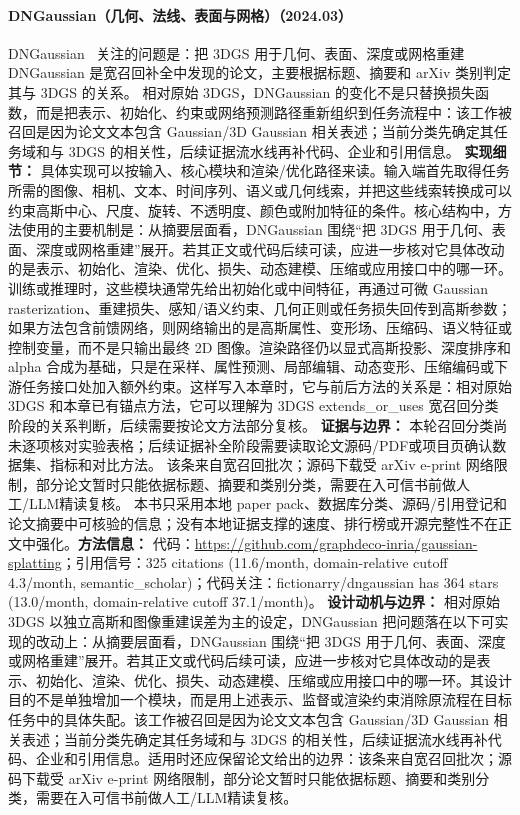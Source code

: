 \paragraph{DNGaussian（几何、法线、表面与网格）（2024.03）}
DNGaussian~\cite{2403_06912} 关注的问题是：把 3DGS 用于几何、表面、深度或网格重建 DNGaussian 是宽召回补全中发现的论文，主要根据标题、摘要和 arXiv 类别判定其与 3DGS 的关系。
相对原始 3DGS，DNGaussian 的变化不是只替换损失函数，而是把表示、初始化、约束或网络预测路径重新组织到任务流程中：该工作被召回是因为论文文本包含 Gaussian/3D Gaussian 相关表述；当前分类先确定其任务域和与 3DGS 的相关性，后续证据流水线再补代码、企业和引用信息。
\textbf{实现细节：} 具体实现可以按输入、核心模块和渲染/优化路径来读。输入端首先取得任务所需的图像、相机、文本、时间序列、语义或几何线索，并把这些线索转换成可以约束高斯中心、尺度、旋转、不透明度、颜色或附加特征的条件。核心结构中，方法使用的主要机制是：从摘要层面看，DNGaussian 围绕“把 3DGS 用于几何、表面、深度或网格重建”展开。若其正文或代码后续可读，应进一步核对它具体改动的是表示、初始化、渲染、优化、损失、动态建模、压缩或应用接口中的哪一环。 训练或推理时，这些模块通常先给出初始化或中间特征，再通过可微 Gaussian rasterization、重建损失、感知/语义约束、几何正则或任务损失回传到高斯参数；如果方法包含前馈网络，则网络输出的是高斯属性、变形场、压缩码、语义特征或控制变量，而不是只输出最终 2D 图像。渲染路径仍以显式高斯投影、深度排序和 alpha 合成为基础，只是在采样、属性预测、局部编辑、动态变形、压缩编码或下游任务接口处加入额外约束。这样写入本章时，它与前后方法的关系是：相对原始 3DGS 和本章已有锚点方法，它可以理解为 3DGS extends\_or\_uses 宽召回分类阶段的关系判断，后续需要按论文方法部分复核。
\textbf{证据与边界：} 本轮召回分类尚未逐项核对实验表格；后续证据补全阶段需要读取论文源码/PDF或项目页确认数据集、指标和对比方法。 该条来自宽召回批次；源码下载受 arXiv e-print 网络限制，部分论文暂时只能依据标题、摘要和类别分类，需要在入可信书前做人工/LLM精读复核。 本书只采用本地 paper pack、数据库分类、源码/引用登记和论文摘要中可核验的信息；没有本地证据支撑的速度、排行榜或开源完整性不在正文中强化。\textbf{方法信息：} 代码：\url{https://github.com/graphdeco-inria/gaussian-splatting}；引用信号：325 citations (11.6/month, domain-relative cutoff 4.3/month, semantic\_scholar)；代码关注：fictionarry/dngaussian has 364 stars (13.0/month, domain-relative cutoff 37.1/month)。
\textbf{设计动机与边界：} 相对原始 3DGS 以独立高斯和图像重建误差为主的设定，DNGaussian 把问题落在以下可实现的改动上：从摘要层面看，DNGaussian 围绕“把 3DGS 用于几何、表面、深度或网格重建”展开。若其正文或代码后续可读，应进一步核对它具体改动的是表示、初始化、渲染、优化、损失、动态建模、压缩或应用接口中的哪一环。其设计目的不是单独增加一个模块，而是用上述表示、监督或渲染约束消除原流程在目标任务中的具体失配。该工作被召回是因为论文文本包含 Gaussian/3D Gaussian 相关表述；当前分类先确定其任务域和与 3DGS 的相关性，后续证据流水线再补代码、企业和引用信息。适用时还应保留论文给出的边界：该条来自宽召回批次；源码下载受 arXiv e-print 网络限制，部分论文暂时只能依据标题、摘要和类别分类，需要在入可信书前做人工/LLM精读复核。

